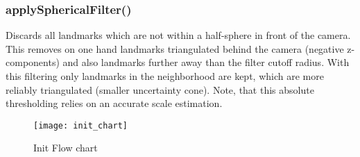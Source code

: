 \subsubsection{applySphericalFilter()}
\label{sub_sec_sphFilter}
Discards all landmarks which are not within a half-sphere in front of the camera. This removes on one hand landmarks triangulated behind the camera (negative z-components) and also landmarks further away than the filter cutoff radius. With this filtering only landmarks in the neighborhood are kept, which are more reliably triangulated (smaller uncertainty cone). Note, that this absolute thresholding relies on an accurate scale estimation.

\begin{figure}[ht]
	\centering
	\texttt{[image: init\_chart]}
	\caption{Init Flow chart}
	\label{img_flow_init}
\end{figure}